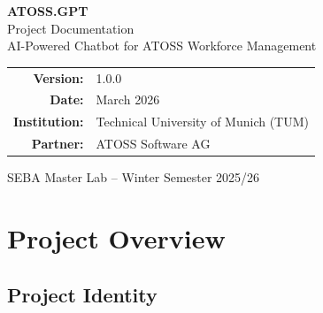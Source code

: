 \documentclass[a4paper,12pt]{report}
\begin{document}
\begin{titlepage}
    \centering
    \vspace*{2cm}

    {\Huge\bfseries\color{TUMDarkBlue} ATOSS.GPT}\\[0.5cm]
    {\Large\color{TUMBlue} Project Documentation}\\[1cm]
    {\large AI-Powered Chatbot for ATOSS Workforce Management}\\[2cm]

    \begin{tabular}{rl}
        \textbf{Version:} & 1.0.0 \\
        \textbf{Date:} & March 2026 \\
        \textbf{Institution:} & Technical University of Munich (TUM) \\
        \textbf{Partner:} & ATOSS Software AG \\
    \end{tabular}

    \vfill

    \hspace{2cm}

    \vspace{1cm}
    {\small SEBA Master Lab -- Winter Semester 2025/26}
\end{titlepage}

\tableofcontents
\newpage
\listoffigures
\listoftables
\newpage

\chapter{Project Overview}

\section{Project Identity}
\end{document}
